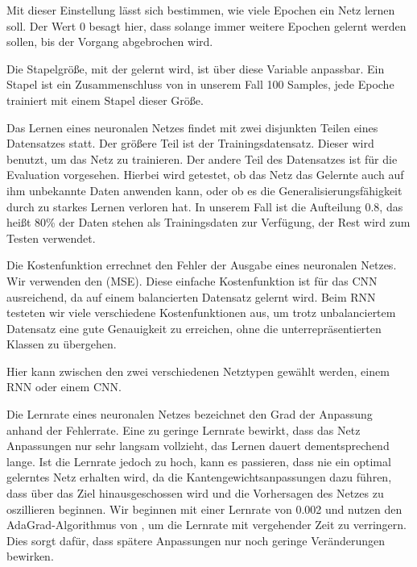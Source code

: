 \begin{description}[font=\texttt]
    \item[epochs]
        Mit dieser Einstellung lässt sich bestimmen, wie viele Epochen ein Netz lernen soll. Der Wert 0 besagt hier, dass solange immer weitere Epochen gelernt werden sollen, bis der Vorgang abgebrochen wird.

    \item[batch\_size]
        Die Stapelgröße, mit der gelernt wird, ist über diese Variable anpassbar. Ein Stapel ist ein Zusammenschluss von in unserem Fall 100 Samples, jede Epoche trainiert mit einem Stapel dieser Größe.

    \item[training\_ratio]
        Das Lernen eines neuronalen Netzes findet mit zwei disjunkten Teilen eines Datensatzes statt. Der größere Teil ist der Trainingsdatensatz. Dieser wird benutzt, um das Netz zu trainieren. Der andere Teil des Datensatzes ist für die Evaluation vorgesehen. Hierbei wird getestet, ob das Netz das Gelernte auch auf ihm unbekannte Daten anwenden kann, oder ob es die Generalisierungsfähigkeit durch zu starkes Lernen verloren hat. In unserem Fall ist die Aufteilung 0.8, das heißt 80\% der Daten stehen als Trainingsdaten zur Verfügung, der Rest wird zum Testen verwendet.

    \item[cost\_function]
        Die Kostenfunktion errechnet den Fehler der Ausgabe eines neuronalen Netzes. Wir verwenden den  (MSE). Diese einfache Kostenfunktion ist für das CNN  ausreichend, da auf einem balancierten Datensatz gelernt wird. Beim RNN testeten wir viele verschiedene Kostenfunktionen aus, um trotz unbalanciertem Datensatz eine gute Genauigkeit zu erreichen, ohne die unterrepräsentierten Klassen zu übergehen.

    \item[network\_type]
        Hier kann zwischen den zwei verschiedenen Netztypen gewählt werden, einem RNN oder einem CNN.

    \item[learning\_rate]
        Die Lernrate eines neuronalen Netzes bezeichnet den Grad der Anpassung anhand der Fehlerrate.
        Eine zu geringe Lernrate bewirkt, dass das Netz Anpassungen nur sehr langsam vollzieht, das Lernen dauert dementsprechend lange. Ist die Lernrate jedoch zu hoch, kann es passieren, dass nie ein optimal gelerntes Netz erhalten wird, da die Kantengewichtsanpassungen dazu führen, dass über das Ziel hinausgeschossen wird und die Vorhersagen des Netzes zu oszillieren beginnen.
        Wir beginnen mit einer Lernrate von 0.002 und nutzen den AdaGrad-Algorithmus von \citet{adagrad}, um die Lernrate mit vergehender Zeit zu verringern. Dies sorgt dafür, dass spätere Anpassungen nur noch geringe Veränderungen bewirken.


\end{description}

